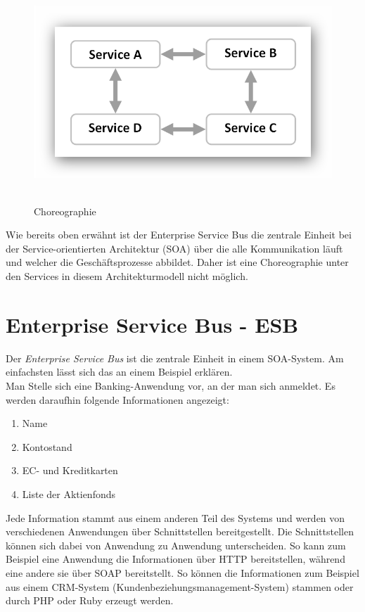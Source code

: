\begin{figure}[htb]
    \centering 
    \includegraphics[width=\linewidth]{content/images/ServiceChoreography}\
    \caption[Choreographie]{Choreographie}
    \label{fig:ServiceOrchestration}  
\end{figure}

Wie bereits oben erwähnt ist der Enterprise Service Bus die zentrale Einheit bei der Service-orientierten Architektur (SOA) über die alle Kommunikation läuft und welcher die Geschäftsprozesse abbildet. Daher ist eine Choreographie unter den Services in diesem Architekturmodell nicht möglich.

\section{Enterprise Service Bus - ESB}
\label{sec:esb}
Der \textit{Enterprise Service Bus} ist die zentrale Einheit in einem SOA-System. Am einfachsten lässt sich das an einem Beispiel erklären.
\\
Man Stelle sich eine Banking-Anwendung vor, an der man sich anmeldet. Es werden daraufhin folgende Informationen angezeigt:

\begin{enumerate}
    \item Name
    \item Kontostand
    \item EC- und Kreditkarten
    \item Liste der Aktienfonds
\end{enumerate}

Jede Information stammt aus einem anderen Teil des Systems und werden von verschiedenen Anwendungen über Schnittstellen bereitgestellt. Die Schnittstellen können sich dabei von Anwendung zu Anwendung unterscheiden. So kann zum Beispiel eine Anwendung die Informationen über HTTP bereitstellen, während eine andere sie über SOAP bereitstellt. So können die Informationen zum Beispiel aus einem CRM-System (Kundenbeziehungsmanagement-System) stammen oder durch PHP oder Ruby erzeugt werden.

